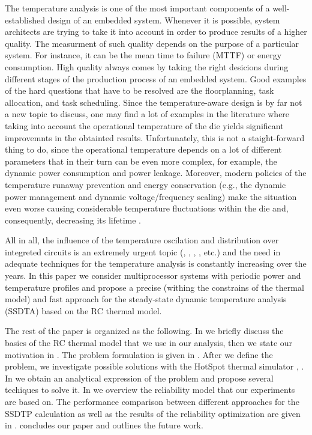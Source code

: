 The temperature analysis is one of the most important components of a well-established design of an embedded system. Whenever it is possible, system architects are trying to take it into account in order to produce results of a higher quality. The measurment of such quality depends on the purpose of a particular system. For instance, it can be the mean time to failure (MTTF) or energy consumption. High quality always comes by taking the right desicions during different stages of the production process of an embedded system. Good examples of the hard questions that have to be resolved are the floorplanning, task allocation, and task scheduling. Since the temperature-aware design is by far not a new topic to discuss, one may find a lot of examples in the literature where taking into account the operational temperature of the die yields significant improvemnts in the obtainted results. Unfortunately, this is not a staight-forward thing to do, since the operational temperature depends on a lot of different parameters that in their turn can be even more complex, for example, the dynamic power consumption and power leakage. Moreover, modern policies of the temperature runaway prevention and energy conservation (e.g., the dynamic power management and dynamic voltage/frequency scaling) make the situation even worse causing considerable temperature fluctuations within the die and, consequently, decreasing its lifetime \cite{simunic2005}.

All in all, the influence of the temperature oscilation and distribution over integreted circuits is an extremely urgent topic (\cite{hieu2004}, \cite{lu2004}, \cite{jedec2010}, \cite{xiang2010}, etc.) and the need in adequate techniques for the temperature analysis is constantly increasing over the years. In this paper we consider multiprocessor systems with periodic power and temperature profiles and propose a precise (withing the constrains of the thermal model) and fast approach for the steady-state dynamic temperature analysis (SSDTA) based on the RC thermal model.

The rest of the paper is organized as the following. In  we briefly discuss the basics of the RC thermal model that we use in our analysis, then we state our motivation in . The problem formulation is given in . After we define the problem, we investigate possible solutions with the HotSpot thermal simulator \cite{huang2006}, . In  we obtain an analytical expression of the problem and propose several techiques to solve it. In  we overview the reliability model that our experiments are based on. The performance comparison between different approaches for the SSDTP calculation as well as the results of the reliability optimization are given in .  concludes our paper and outlines the future work.
